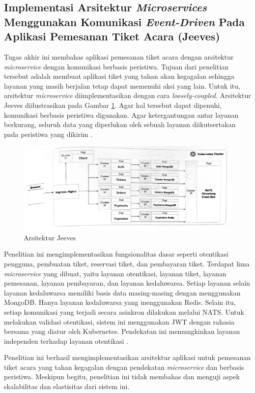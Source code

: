 \subsection{Implementasi Arsitektur \textit{Microservices} Menggunakan Komunikasi \textit{Event-Driven} Pada Aplikasi Pemesanan Tiket Acara (Jeeves)}

Tugas akhir ini membahas aplikasi pemesanan tiket acara dengan arsitektur \textit{microservice} dengan komunikasi berbasis peristiwa. Tujuan dari penelitian tersebut adalah membuat aplikasi tiket yang tahan akan kegagalan sehingga layanan yang masih berjalan tetap dapat memenuhi aksi yang lain. Untuk itu, arsitektur \textit{microservice} diimplementasikan dengan cara \textit{loosely-coupled}. Arsitektur Jeeves diilustrasikan pada Gambar \ref{fig:jeeves-architecture}. Agar hal tersebut dapat dipenuhi, komunikasi berbasis peristiwa digunakan. Agar ketergantungan antar layanan berkurang, seluruh data yang diperlukan oleh sebuah layanan diikutsertakan pada peristiwa yang dikirim \parencite{microservicesEventDriven}.

\begin{figure}[htbp]
    \centering
    \includegraphics[width=1\textwidth]{resources/chapter-2/jeeves.png}
    \caption{Arsitektur Jeeves \parencite{microservicesEventDriven}}
    \label{fig:jeeves-architecture}
\end{figure}

Penelitian ini mengimplementasikan fungsionalitas dasar seperti otentikasi pengguna, pembuatan tiket, reservasi tiket, dan pembayaran tiket. Terdapat lima \textit{microservice} yang dibuat, yaitu layanan otentikasi, layanan tiket, layanan pemesanan, layanan pembayaran, dan layanan kedaluwarsa. Setiap layanan selain layanan kedaluwarsa memiliki basis data masing-masing dengan menggunakan MongoDB. Hanya layanan kedaluwarsa yang menggunakan Redis. Selain itu, setiap komunikasi yang terjadi secara asinkron dilakukan melalui NATS. Untuk melakukan validasi otentikasi, sistem ini menggunakan JWT dengan rahasia bersama yang diatur oleh Kubernetes. Pendekatan ini memungkinkan layanan independen terhadap layanan otentikasi \parencite{microservicesEventDriven}.

Penelitian ini berhasil mengimplementasikan arsitektur aplikasi untuk pemesanan tiket acara yang tahan kegagalan dengan pendekatan \textit{microservice} dan berbasis peristiwa. Meskipun begitu, penelitian ini tidak membahas dan menguji aspek skalabilitas dan elastisitas dari sistem ini.